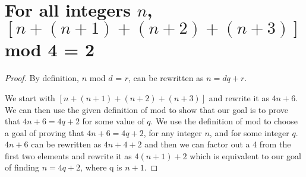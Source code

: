 \documentclass[12pt]{article}
\begin{document}
\section*{For all integers $n$,$[n+(n+1)+(n+2)+(n+3)]$ mod 4 = 2}
\begin{proof} %
By definition, $n$ mod $d$ = $r$, can be rewritten as $n = dq + r$.

We start with $[n+(n+1)+(n+2)+(n+3)]$ and rewrite it as $4n+6$.
We can then use the given definition of mod to show that our goal is
to prove that $4n + 6 = 4q+2$ for some value of $q$.
We use the definition of mod to choose a goal of proving that $4n+6 =
4q + 2$, for any integer $n$, and for some integer $q$.
$4n + 6$ can be rewritten as $4n + 4 + 2$ and then we can factor out a
4 from the first two elements and rewrite it as $4(n + 1) + 2$ which
is equivalent to our goal of finding $n = 4q + 2$, where q is $n + 1$.

\end{proof}
\end{document}
